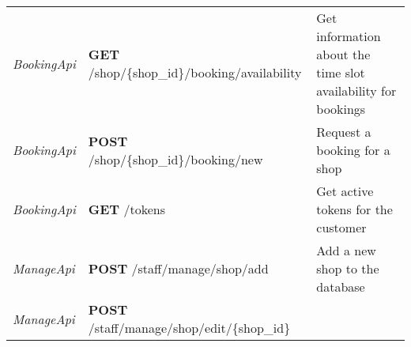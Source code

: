 \begin{longtable}[]{@{}lll@{}}
\begin{minipage}[t]{0.29\columnwidth}
\emph{BookingApi}\strut
\end{minipage} & \begin{minipage}[t]{0.31\columnwidth}\raggedright
\textbf{GET} /shop/\{shop\_id\}/booking/availability\strut
\end{minipage} & \begin{minipage}[t]{0.31\columnwidth}\raggedright
Get information about the time slot availability for bookings\strut
\end{minipage}\tabularnewline
\begin{minipage}[t]{0.29\columnwidth}\raggedright
\emph{BookingApi}\strut
\end{minipage} & \begin{minipage}[t]{0.31\columnwidth}\raggedright
\textbf{POST} /shop/\{shop\_id\}/booking/new\strut
\end{minipage} & \begin{minipage}[t]{0.31\columnwidth}\raggedright
Request a booking for a shop\strut
\end{minipage}\tabularnewline
\begin{minipage}[t]{0.29\columnwidth}\raggedright
\emph{BookingApi}\strut
\end{minipage} & \begin{minipage}[t]{0.31\columnwidth}\raggedright
\textbf{GET} /tokens\strut
\end{minipage} & \begin{minipage}[t]{0.31\columnwidth}\raggedright
Get active tokens for the customer\strut
\end{minipage}\tabularnewline
\begin{minipage}[t]{0.29\columnwidth}\raggedright
\emph{ManageApi}\strut
\end{minipage} & \begin{minipage}[t]{0.31\columnwidth}\raggedright
\textbf{POST} /staff/manage/shop/add\strut
\end{minipage} & \begin{minipage}[t]{0.31\columnwidth}\raggedright
Add a new shop to the database\strut
\end{minipage}\tabularnewline
\begin{minipage}[t]{0.29\columnwidth}\raggedright
\emph{ManageApi}\strut
\end{minipage} & \begin{minipage}[t]{0.31\columnwidth}\raggedright
\textbf{POST} /staff/manage/shop/edit/\{shop\_id\}\strut
\end{minipage} & \begin{minipage}[t]{0.31\columnwidth}\raggedright

\end{minipage}
\end{longtable}

